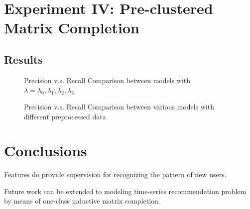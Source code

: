 \documentclass{article} %
\begin{document}
\newpage
\section{Experiment IV: Pre-clustered Matrix Completion}

\subsection{Results}



\begin{figure}[h]

    \caption{Precision v.s. Recall Comparison between models with
        $\lambda=\lambda_0, \lambda_1,\lambda_2, \lambda_3$ }
\end{figure}

\begin{figure}[h]

    \caption{Precision v.s. Recall Comparison between various models with
        different preprocessed data}
\end{figure}

\section{Conclusions}
Features do provide supervision for recognizing the pattern of new users. 

Future work can be extended to modeling time-series recommendation problem by
means of one-class inductive matrix completion. 

{}

\end{document}
